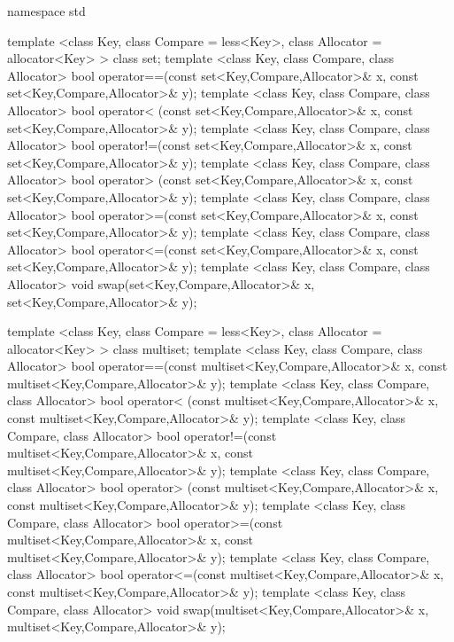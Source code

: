 %

\begin{codeblock}
namespace std {
  template <class Key, class Compare = less<Key>,
            class Allocator = allocator<Key> >
    class set;
  template <class Key, class Compare, class Allocator>
    bool operator==(const set<Key,Compare,Allocator>& x,
                    const set<Key,Compare,Allocator>& y);
  template <class Key, class Compare, class Allocator>
    bool operator< (const set<Key,Compare,Allocator>& x,
                    const set<Key,Compare,Allocator>& y);
  template <class Key, class Compare, class Allocator>
    bool operator!=(const set<Key,Compare,Allocator>& x,
                    const set<Key,Compare,Allocator>& y);
  template <class Key, class Compare, class Allocator>
    bool operator> (const set<Key,Compare,Allocator>& x,
                    const set<Key,Compare,Allocator>& y);
  template <class Key, class Compare, class Allocator>
    bool operator>=(const set<Key,Compare,Allocator>& x,
                    const set<Key,Compare,Allocator>& y);
  template <class Key, class Compare, class Allocator>
    bool operator<=(const set<Key,Compare,Allocator>& x,
                    const set<Key,Compare,Allocator>& y);
  template <class Key, class Compare, class Allocator>
    void swap(set<Key,Compare,Allocator>& x,
              set<Key,Compare,Allocator>& y);

  template <class Key, class Compare = less<Key>,
            class Allocator = allocator<Key> >
    class multiset;
  template <class Key, class Compare, class Allocator>
    bool operator==(const multiset<Key,Compare,Allocator>& x,
                    const multiset<Key,Compare,Allocator>& y);
  template <class Key, class Compare, class Allocator>
    bool operator< (const multiset<Key,Compare,Allocator>& x,
                    const multiset<Key,Compare,Allocator>& y);
  template <class Key, class Compare, class Allocator>
    bool operator!=(const multiset<Key,Compare,Allocator>& x,
                    const multiset<Key,Compare,Allocator>& y);
  template <class Key, class Compare, class Allocator>
    bool operator> (const multiset<Key,Compare,Allocator>& x,
                    const multiset<Key,Compare,Allocator>& y);
  template <class Key, class Compare, class Allocator>
    bool operator>=(const multiset<Key,Compare,Allocator>& x,
                    const multiset<Key,Compare,Allocator>& y);
  template <class Key, class Compare, class Allocator>
    bool operator<=(const multiset<Key,Compare,Allocator>& x,
                    const multiset<Key,Compare,Allocator>& y);
  template <class Key, class Compare, class Allocator>
    void swap(multiset<Key,Compare,Allocator>& x,
              multiset<Key,Compare,Allocator>& y);
}
\end{codeblock}

